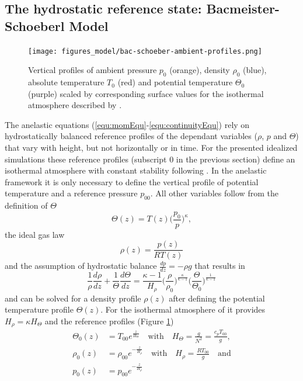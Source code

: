 \subsection*{The hydrostatic reference state: Bacmeister-Schoeberl Model}
\begin{figure}[tbp]
    \centering
    \texttt{[image: figures\_model/bac-schoeber-ambient-profiles.png]}
    \caption{Vertical profiles of ambient pressure $p_0$ (orange), density $\rho_0$ (blue), absolute temperature $T_0$ (red) and potential temperature $\Theta_0$ (purple) scaled by corresponding surface values for the isothermal atmosphere described by \textcite[]{bacmeister_breakdown_1989}.}
    \label{fig:ambient_profs}
\end{figure}
\label{sec:ambient-profiles}
The anelastic equations (\ref{equ:momEqu}-\ref{equ:continuityEqu}) rely on hydrostatically balanced reference profiles of the dependant variables ($\rho$, $p$ and $\Theta$) that vary with height, but not horizontally or in time. For the presented idealized simulations these reference profiles (subscript 0 in the previous section) define an isothermal atmosphere with constant stability following \textcite{bacmeister_breakdown_1989}. In the anelastic framework it is only necessary to define the vertical profile of potential temperature and a reference pressure $p_{00}$. All other variables follow from the definition of $\Theta$
\begin{equation}
    \Theta(z) = T(z) \biggl(\frac{p_{0}}{p}\biggr)^{\kappa},
    \label{equ:poissonEqu}
\end{equation}
the ideal gas law
\begin{equation}
    \rho(z) = \frac{p(z)}{R T(z)}
    \label{equ:idealGas}
\end{equation}
and the assumption of hydrostatic balance $\frac{dp}{dz}=-\rho g$ that results in
\begin{equation}
    \frac{1}{\rho} \frac{d \rho}{dz} + \frac{1}{\Theta} \frac{d \Theta}{dz} = \frac{\kappa-1}{H_{\rho}} \biggl(\frac{\rho}{\rho_0} \biggr)^{\frac{\kappa}{\kappa-1}} \biggl(\frac{\Theta}{\Theta_0} \biggr)^{\frac{1}{\kappa-1}}
    \label{equ:hydro-balance}
\end{equation}
and can be solved for a density profile $\rho(z)$ after defining the potential temperature profile $\Theta(z)$. For the isothermal atmosphere of \textcite[]{bacmeister_breakdown_1989} it provides $H_{\rho} = \kappa H_{\Theta}$ and the reference profiles (Figure \ref{fig:ambient_profs})
\begin{equation}
    \begin{aligned}
        \Theta_0(z) &= T_{00} e^{\frac{z}{H_{\Theta}}} \quad \textrm{with} \quad H_{\Theta} = \frac{g}{N^2} = \frac{c_p T_{00}}{g}, \\
        \rho_0(z) &= \rho_{00} e^{-\frac{z}{H_{\rho}}} \quad \textrm{with} \quad H_{\rho} = \frac{R T_{00}}{g} \quad \textrm{and}  \\
        p_0(z) &= p_{00} e^{-\frac{z}{H_{\rho}}}
        \label{equ:ambient-profiles}
    \end{aligned}
\end{equation}
